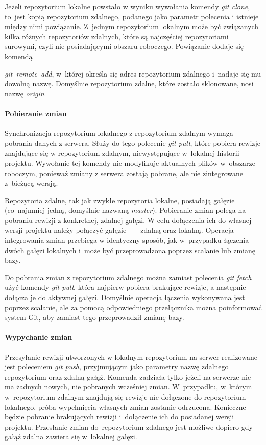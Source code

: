 \documentclass[12pt,a4paper,polish,thesis]{dcsbook}
\begin{document}
	Jeżeli repozytorium lokalne powstało w wyniku wywołania komendy \textit{git clone}, to~jest kopią repozytorium zdalnego, podanego jako parametr polecenia i istnieje między nimi powiązanie.
	Z~jednym repozytorium lokalnym może być związanych kilka różnych repozytoriów zdalnych, które są najczęściej repozytoriami surowymi, czyli nie posiadającymi obszaru roboczego. Powiązanie dodaje się komendą {\textit{git~remote~add}, w~której określa się adres repozytorium zdalnego i~nadaje się mu dowolną nazwę. Domyślnie repozytorium zdalne, które zostało sklonowane, nosi nazwę \mbox{\textit{origin}}.

	\paragraph{Pobieranie zmian}
	Synchronizacja repozytorium lokalnego z repozytorium zdalnym wymaga pobrania danych z serwera. Służy do tego polecenie \textit{git pull}, które pobiera rewizje znajdujące się w repozytorium zdalnym, niewystępujące w~lokalnej historii projektu. Wywołanie tej komendy nie modyfikuje aktualnych plików w~obszarze roboczym, ponieważ zmiany z serwera zostają pobrane, ale nie zintegrowane z~bieżącą wersją.

	Repozytoria zdalne, tak jak zwykłe repozytoria lokalne, posiadają gałęzie (co~najmniej jedną, domyślnie nazwaną \textit{master}). Pobieranie zmian polega na pobraniu rewizji z konkretnej, zdalnej gałęzi. W celu dołączenia ich do własnej wersji projektu należy połączyć gałęzie~---~zdalną oraz lokalną. Operacja integrowania zmian przebiega w identyczny sposób, jak w~przypadku łączenia dwóch gałęzi lokalnych i~może być przeprowadzona poprzez scalanie lub zmianę bazy.

	Do pobrania zmian z repozytorium zdalnego można zamiast polecenia \textit{git fetch} użyć komendy \textit{git pull}, która najpierw pobiera brakujące rewizje, a następnie dołącza je do aktywnej gałęzi. Domyślnie operacja łączenia wykonywana jest poprzez scalanie, ale za pomocą odpowiedniego przełącznika można poinformować system Git, aby zamiast tego przeprowadził zmianę bazy.

	\paragraph{Wypychanie zmian}
	Przesyłanie rewizji utworzonych w lokalnym repozytorium na serwer realizowane jest poleceniem \textit{git push}, przyjmującym jako parametry nazwę zdalnego repozytorium oraz zdalną gałąź. Komenda zadziała tylko jeżeli na serwerze nie ma żadnych nowych, nie pobranych wcześniej zmian. W~przypadku, w~którym w~repozytorium zdalnym znajdują się rewizje nie dołączone do repozytorium lokalnego, próba wypchnięcia własnych zmian zostanie odrzucona. Konieczne będzie pobranie brakujących rewizji i~dołączenie ich do posiadanej wersji projektu. Przesłanie zmian do~repozytorium zdalnego jest możliwe dopiero gdy gałąź zdalna zawiera się w~lokalnej gałęzi.

}
\end{document}
